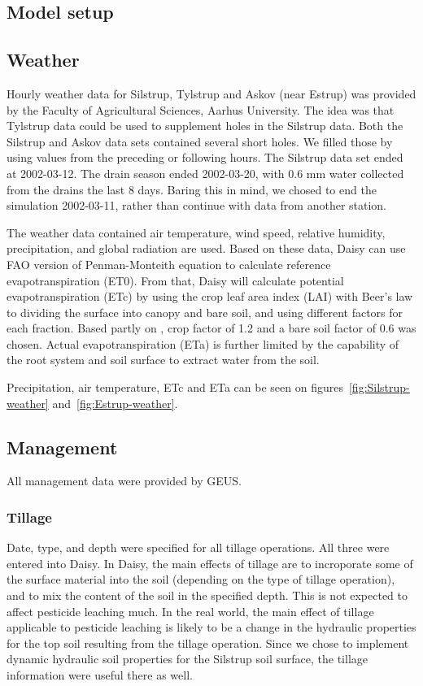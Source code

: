 \documentclass[a4paper]{article}
\begin{document}
\begin{text}
\section{Model setup}

\subsection{Weather}

Hourly weather data for Silstrup, Tylstrup and Askov (near Estrup) was
provided by the Faculty of Agricultural Sciences, Aarhus University.
The idea was that Tylstrup data could be used to supplement holes in
the Silstrup data.  Both the Silstrup and Askov data sets contained
several short holes.  We filled those by using values from the
preceding or following hours.  The Silstrup data set ended at
2002-03-12.  The drain season ended 2002-03-20, with 0.6 mm water
collected from the drains the last 8 days.  Baring this in mind, we
chosed to end the simulation 2002-03-11, rather than continue with
data from another station.

The weather data contained air temperature, wind speed, relative
humidity, precipitation, and global radiation are used.  Based on
these data, Daisy can use FAO version of Penman-Monteith equation
\citep{FAO-PM} to calculate reference evapotranspiration (ET0).  From
that, Daisy will calculate potential evapotranspiration (ETc) by using
the crop leaf area index (LAI) with Beer's law to dividing the surface
into canopy and bare soil, and using different factors for each
fraction.  Based partly on \citet{kjaersgaard2008crop}, crop factor of
1.2 and a bare soil factor of 0.6 was chosen.  Actual
evapotranspiration (ETa) is further limited by the capability of the
root system and soil surface to extract water from the soil.

Precipitation, air temperature, ETc and ETa can be seen on
figures~\ref{fig:Silstrup-weather} and~\ref{fig:Estrup-weather}.

\subsection{Management}

All management data were provided by GEUS.

\subsubsection{Tillage}

Date, type, and depth were specified for all tillage operations.  All
three were entered into Daisy.  In Daisy, the main effects of tillage
are to incroporate some of the surface material into the soil
(depending on the type of tillage operation), and to mix the content
of the soil in the specified depth.  This is not expected to affect
pesticide leaching much.  In the real world, the main effect of
tillage applicable to pesticide leaching is likely to be a change in
the hydraulic properties for the top soil resulting from the tillage
operation.  Since we chose to implement dynamic hydraulic soil
properties for the Silstrup soil surface, the tillage information were
useful there as well.


\end{text}
\end{document}
